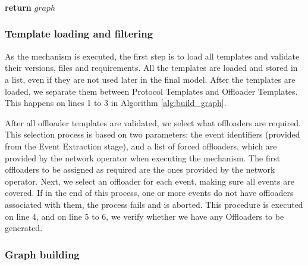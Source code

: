 \begin{algorithm}[htb]
     \\
    
    \vspace{1em}
            
     \\
     \\
     \\
     \\
    
    \vspace{1em}
            
    \textbf{return} $graph$  \\
\end{algorithm}


\subsubsection*{Template loading and filtering}

As the mechanism is executed, the first step is to load all templates and validate their versions, files and requirements. All the templates are loaded and stored in a list, even if they are not used later in the final model. After the templates are loaded, we separate them between Protocol Templates and Offloader Templates. This happens on lines 1 to 3 in Algorithm \ref{alg:build_graph}.

After all offloader templates are validated, we select what offloaders are required. This selection process is based on two parameters: the event identifiers (provided from the Event Extraction stage), and a list of forced offloaders, which are provided by the network operator when executing the mechanism. The first offloaders to be assigned as required are the ones provided by the network operator. Next, we select an offloader for each event, making sure all events are covered. If in the end of this process, one or more events do not have offloaders associated with them, the process fails and is aborted. This procedure is executed on line 4, and on line 5 to 6, we verify whether we have any Offloaders to be generated.

\subsubsection*{Graph building}

